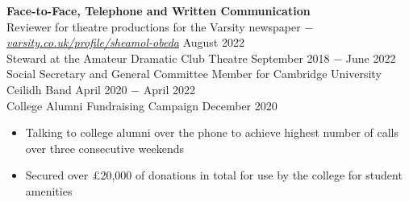 \documentclass{article}
\begin{document}
\textbf{Face-to-Face, Telephone and Written Communication}\\
Reviewer for theatre productions for the Varsity newspaper $-$ \href{https://www.varsity.co.uk/profile/sheamol-obeda}{\underline{\textit{varsity.co.uk/profile/sheamol-obeda}}} \hfill August 2022 \\
Steward at the Amateur Dramatic Club Theatre \hfill September 2018 $-$ June 2022 \\
Social Secretary and General Committee Member for Cambridge University Ceilidh Band \hfill April 2020 $-$ April 2022\\
College Alumni Fundraising Campaign \hfill December 2020
\begin{itemize}
    \item Talking to college alumni over the phone to achieve highest number of calls over three consecutive weekends
    \item Secured over £20,000 of donations in total for use by the college for student amenities
\end{itemize} \medskip
\end{document}
